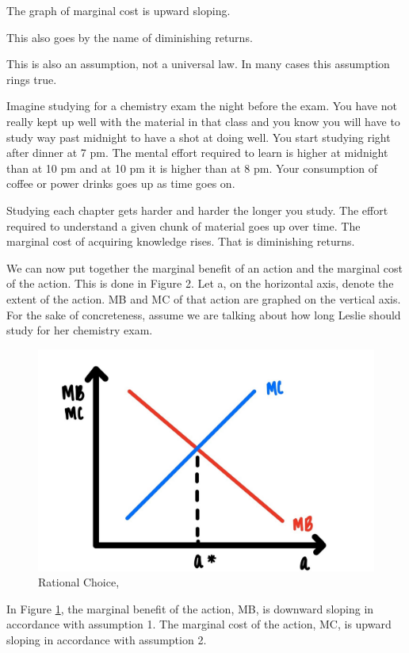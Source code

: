 \documentclass[
]{book}
\begin{document}
The graph of marginal cost is upward sloping.

This also goes by the name of diminishing returns.

This is also an assumption, not a universal law. In many cases this assumption rings true.

Imagine studying for a chemistry exam the night before the exam. You have not really kept up well with the material in that class and you know you will have to study way past midnight to have a shot at doing well. You start studying right after dinner at 7 pm. The mental effort required to learn is higher at midnight than at 10 pm and at 10 pm it is higher than at 8 pm. Your consumption of coffee or power drinks goes up as time goes on.

Studying each chapter gets harder and harder the longer you study. The effort required to understand a given chunk of material goes up over time. The marginal cost of acquiring knowledge rises. That is diminishing returns.

We can now put together the marginal benefit of an action and the marginal cost of the action. This is done in Figure 2. Let a, on the horizontal axis, denote the extent of the action. MB and MC of that action are graphed on the vertical axis. For the sake of concreteness, assume we are talking about how long Leslie should study for her chemistry exam.

\begin{figure}

{\centering \includegraphics[width=0.75\linewidth]{img/rationalchoice/fig2} 

}

\caption{Rational Choice,}\label{fig:rationalchoice02}
\end{figure}

In Figure \ref{fig:rationalchoice02}, the marginal benefit of the action, MB, is downward sloping in accordance with assumption 1. The marginal cost of the action, MC, is upward sloping in accordance with assumption 2.
\end{document}
